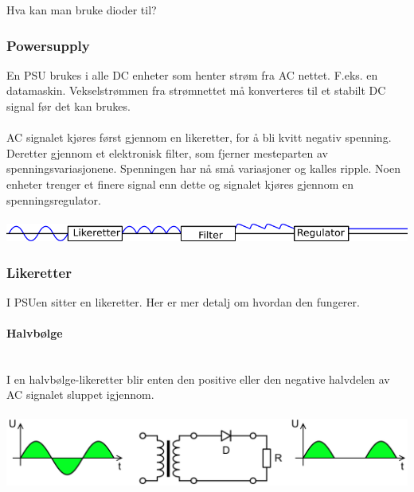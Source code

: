 Hva kan man bruke dioder til?

\subsubsection{Powersupply}
En PSU brukes i alle DC enheter som henter strøm fra AC nettet.
F.eks. en datamaskin.
Vekselstrømmen fra strømnettet må konverteres til
et stabilt DC signal før det kan brukes.
\\\\
AC signalet kjøres først gjennom en likeretter,
for å bli kvitt negativ spenning.
Deretter gjennom et elektronisk filter,
som fjerner mesteparten av spenningsvariasjonene.
Spenningen har nå små variasjoner og kalles ripple.
Noen enheter trenger et finere signal enn dette og
signalet kjøres gjennom en spenningsregulator.
\\\\
\includegraphics[width=\textwidth]{./img/psu}



\subsubsection{Likeretter}
I PSUen sitter en likeretter.
Her er mer detalj om hvordan den fungerer.

\paragraph{Halvbølge} \mbox{} \\
I en halvbølge-likeretter blir enten den positive eller den negative
halvdelen av AC signalet sluppet igjennom.
\\\\
\includegraphics[width=\textwidth]{./img/halvbolge}

